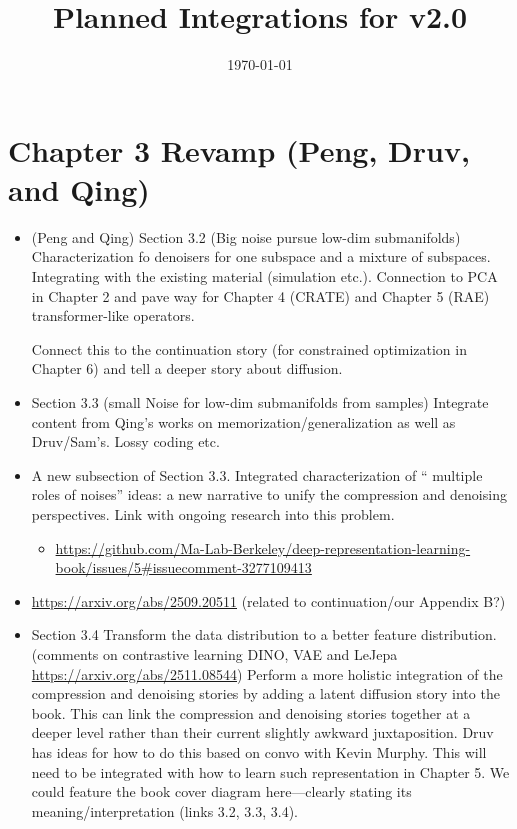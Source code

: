 \documentclass{article}
\title{Planned Integrations for v2.0}
\date{\today}
\begin{document}
\maketitle
\section{Chapter 3 Revamp (Peng, Druv, and Qing)}

\begin{itemize}

    \item (Peng and Qing) Section 3.2 (Big noise pursue low-dim submanifolds) Characterization fo denoisers for one subspace and a mixture of subspaces. Integrating with the existing material (simulation etc.). Connection to PCA in Chapter 2 and pave way for Chapter 4 (CRATE) and Chapter 5 (RAE) transformer-like operators. 
     
    Connect this to the continuation story (for constrained optimization in Chapter 6) and tell a deeper story about diffusion.

    \item Section 3.3 (small Noise for low-dim submanifolds from samples)     Integrate content from Qing's works on memorization/generalization as well as Druv/Sam's. Lossy coding etc. 
    
    \item A new subsection of Section 3.3. Integrated characterization of `` multiple roles of noises'' ideas: a new narrative to unify the compression and denoising perspectives. Link with ongoing research into this problem.
    \begin{itemize}
        \item \url{https://github.com/Ma-Lab-Berkeley/deep-representation-learning-book/issues/5#issuecomment-3277109413}
    \end{itemize}
    \item \url{https://arxiv.org/abs/2509.20511} (related to continuation/our Appendix B?)
    
    \item Section 3.4 Transform the data distribution to a better feature distribution. (comments on contrastive learning DINO, VAE and LeJepa \url{https://arxiv.org/abs/2511.08544})
    Perform a more holistic integration of the compression and denoising stories by adding a latent diffusion story into the book. This can link the compression and denoising stories together at a deeper level rather than their current slightly awkward juxtaposition. Druv has ideas for how to do this based on convo with Kevin Murphy. This will need to be integrated with how to learn such representation in Chapter 5.
    We could feature the book cover diagram here---clearly stating its meaning/interpretation (links 3.2, 3.3, 3.4).

\end{itemize}
\end{document}
